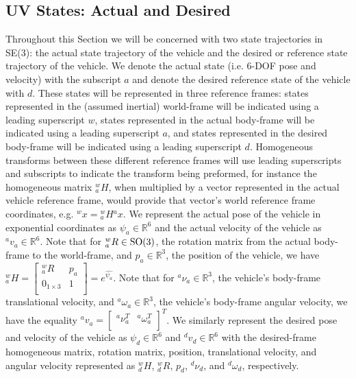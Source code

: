 
\subsection{\ac{UV} States: Actual and Desired}
\label{chUV_AMBC.sec.states}

Throughout this Section we will be concerned with two state trajectories
in SE(3): the actual state trajectory of the vehicle and the desired
or reference state trajectory of the vehicle.
%
We denote the actual state (i.e. 6-\ac{DOF} pose and velocity) with
the subscript $a$ and denote the desired reference state of the
vehicle with $d$.
%
These states will be represented in three reference frames: states
represented in the (assumed inertial) world-frame will be indicated
using a leading superscript $w$, states represented in the actual
body-frame will be indicated using a leading superscript $a$, and
states represented in the desired body-frame will be indicated using a
leading superscript $d$.
%
Homogeneous transforms between these different reference frames will
use leading superscripts and subscripts to indicate the transform
being preformed, for instance the homogeneous matrix ${^w_a}H$, when
multiplied by a vector represented in the actual vehicle reference
frame, would provide that vector's world reference frame coordinates,
e.g. ${^w}x={^w_a}H{^a}x$.
%
We represent the actual pose of the vehicle in exponential coordinates
as $\psi_a\in\mathbb{R}^6$ and the actual velocity of the vehicle as
${^a}v_a\in\mathbb{R}^6$. 
%
Note that for ${^w_a}R\in\SO3$, the rotation matrix from the actual
body-frame to the world-frame, and $p_a\in\mathbb{R}^3$, the position
of the vehicle, we have
%
${^w_a}H=\left[ \begin{array}{cc}
    {^w_a}R      & p_a  \\
    0_{1 \times 3}  & 1  \\
  \end{array} \right]
=e^{\widehat{\psi_a}}$.
%
Note that for ${^a}\nu_a\in\mathbb{R}^3$, the vehicle's body-frame
translational velocity, and ${^a}\omega_a\in\mathbb{R}^3$, the
vehicle's body-frame angular velocity, we have the equality
%
${^a}v_a=\left[ \begin{array}{cc} {^a}\nu_a^T &
    {^a}\omega_a^T \\ \end{array} \right]^T$.
%
We similarly represent the desired pose and velocity of the vehicle as
$\psi_d\in\mathbb{R}^6$ and ${^d}v_d\in\mathbb{R}^6$ with the
desired-frame homogeneous matrix, rotation matrix, position,
translational velocity, and angular velocity represented as ${^w_d}H$,
${^w_d}R$, $p_d$, ${^d}\nu_d$, and ${^d}\omega_d$, respectively.

